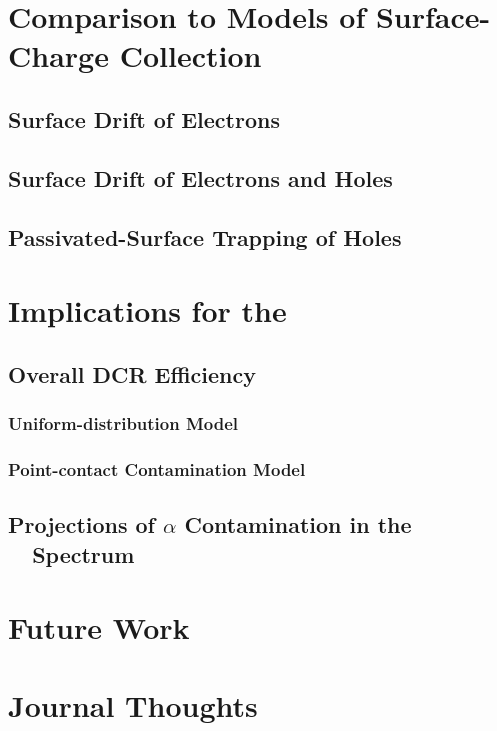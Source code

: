 \documentclass[groupedaddress,rmp,amsmath,amssymb,bibnotes,altaffilletter,twocolumn]{revtex4-1}
\begin{document}
\section{Comparison to Models of Surface-Charge Collection}
\subsection{Surface Drift of Electrons}
\subsection{Surface Drift of Electrons and Holes}
\subsection{Passivated-Surface Trapping of Holes}

\section{Implications for the \MJ\ \DEM\ }
\subsection{Overall DCR Efficiency}
\subsubsection{Uniform-distribution Model}
\subsubsection{Point-contact Contamination Model}

\subsection{Projections of $\alpha$ Contamination in the \MJ\ \DEM\ Spectrum}

\section{Future Work}



\section{Journal Thoughts}





\end{document}
